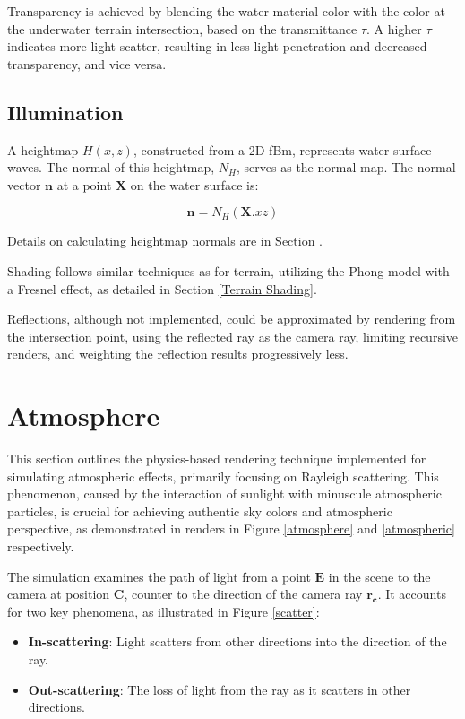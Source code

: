 Transparency is achieved by blending the water material color with the color at the underwater terrain intersection, based on the transmittance $\tau$. A higher $\tau$ indicates more light scatter, resulting in less light penetration and decreased transparency, and vice versa.

\subsection{Illumination}
\label{Water Shading}

A heightmap $H(x,z)$, constructed from a 2D fBm, represents water surface waves. The normal of this heightmap, $N_H$, serves as the normal map. The normal vector $\mathbf{n}$ at a point $\mathbf{X}$ on the water surface is:

\begin{equation}
\mathbf{n}= N_{H}(\mathbf{X}.xz)
\end{equation}

Details on calculating heightmap normals are in Section .

Shading follows similar techniques as for terrain, utilizing the Phong model with a Fresnel effect, as detailed in Section \ref{Terrain Shading}. 

Reflections, although not implemented, could be approximated by rendering from the intersection point, using the reflected ray as the camera ray, limiting recursive renders, and weighting the reflection results progressively less. 

\section{Atmosphere}

This section outlines the physics-based rendering technique implemented for simulating atmospheric effects, primarily focusing on Rayleigh scattering. This phenomenon, caused by the interaction of sunlight with minuscule atmospheric particles, is crucial for achieving authentic sky colors and atmospheric perspective, as demonstrated in renders in Figure \ref{atmosphere}  and \ref{atmospheric} respectively.

The simulation examines the path of light from a point $\mathbf{E}$ in the scene to the camera at position $\mathbf{C}$, counter to the direction of the camera ray $\mathbf{r_c}$. It accounts for two key phenomena, as illustrated in Figure \ref{scatter}:
\begin{itemize}
    \item \textbf{In-scattering}: Light scatters from other directions into the direction of the ray.
    \item \textbf{Out-scattering}: The loss of light from the ray as it scatters in other directions.
\end{itemize}


